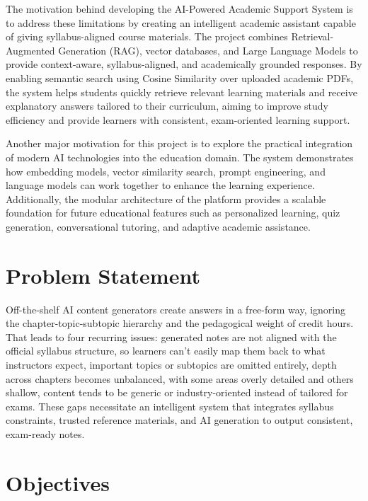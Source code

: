 The motivation behind developing the AI-Powered Academic Support System is to address these limitations by creating an intelligent academic assistant capable of giving syllabus-aligned course materials. The project combines Retrieval-Augmented Generation (RAG), vector databases, and Large Language Models to provide context-aware, syllabus-aligned, and academically grounded responses. By enabling semantic search using Cosine Similarity over uploaded academic PDFs, the system helps students quickly retrieve relevant learning materials and receive explanatory answers tailored to their curriculum, aiming to improve study efficiency and provide learners with consistent, exam-oriented learning support. \par

Another major motivation for this project is to explore the practical integration of modern AI technologies into the education domain. The system demonstrates how embedding models, vector similarity search, prompt engineering, and language models can work together to enhance the learning experience. Additionally, the modular architecture of the platform provides a scalable foundation for future educational features such as personalized learning, quiz generation, conversational tutoring, and adaptive academic assistance. \par

\section{Problem Statement}
Off-the-shelf AI content generators create answers in a free-form way, ignoring the chapter-topic-subtopic hierarchy and the pedagogical weight of credit hours. That leads to four recurring issues: generated notes are not aligned with the official syllabus structure, so learners can’t easily map them back to what instructors expect, important topics or subtopics are omitted entirely, depth across chapters becomes unbalanced, with some areas overly detailed and others shallow, content tends to be generic or industry-oriented instead of tailored for exams. These gaps necessitate an intelligent system that integrates syllabus constraints, trusted reference materials, and AI generation to output consistent, exam-ready notes. \par

\section{Objectives}

